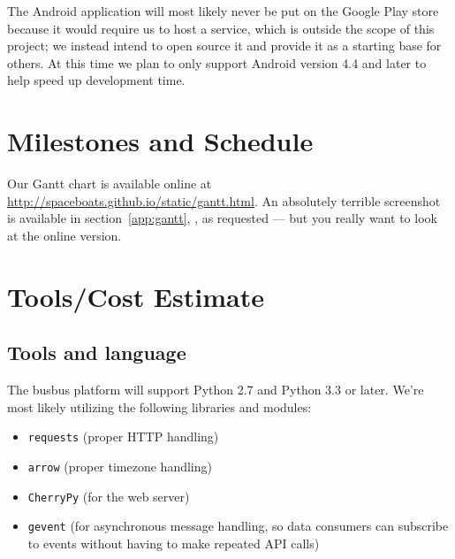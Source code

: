 \documentclass[12pt]{article}
\begin{document}
The Android application will most likely never
be put on the Google Play store because it would require us to host a service, which is outside the scope of this
project; we instead intend to open source it and provide it as a starting base for others.
At this time we plan to only support Android version 4.4 and later to help speed up development time.

\section{Milestones and Schedule}
Our Gantt chart is available online at \url{http://spaceboats.github.io/static/gantt.html}.
An absolutely terrible screenshot is available in section~\ref{app:gantt}, \textit{}, as requested --- but you really want to look at the online version.

\section{Tools/Cost Estimate}
\subsection{Tools and language}
The busbus platform will support Python 2.7 and Python 3.3 or later. We're most likely utilizing the following
libraries and modules:
\begin{itemize}
	\item \texttt{requests} (proper HTTP handling)
	\item \texttt{arrow} (proper timezone handling)
	\item \texttt{CherryPy} (for the web server)
	\item \texttt{gevent} (for asynchronous message handling, so data consumers can subscribe to events
		without having to make repeated API calls)
\end{itemize}
\end{document}

